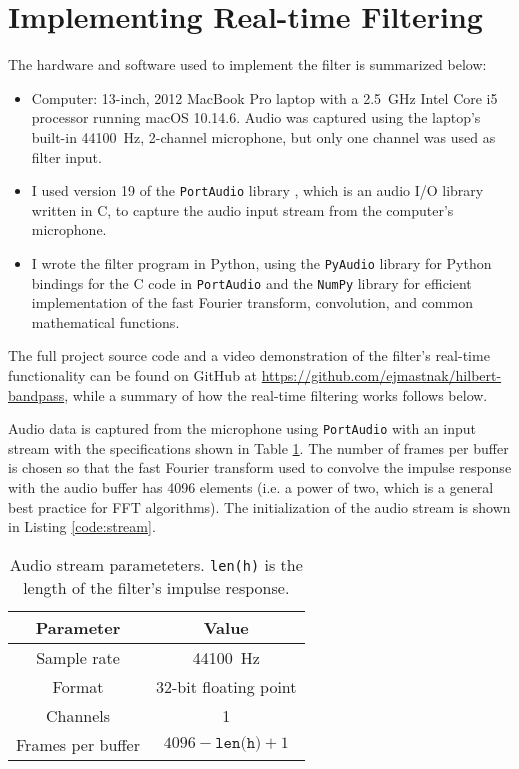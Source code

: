 \clearpage
\restoregeometry

\section{Implementing Real-time Filtering}
The hardware and software used to implement the filter is summarized below:
\begin{itemize}

    \item Computer: 13-inch, 2012 MacBook Pro laptop with a \SI{2.5}{\giga \hertz} Intel Core i5 processor running macOS 10.14.6.
    Audio was captured using the laptop's built-in \SI{44100}{\hertz}, 2-channel microphone, but only one channel was used as filter input.

    \item I used version 19 of the \texttt{PortAudio} library \cite{portaudio}, which is an audio I/O library written in C, to capture the audio input stream from the computer's microphone.

    \item I wrote the filter program in Python, using the \texttt{PyAudio} library \cite{pyaudio} for Python bindings for the C code in \texttt{PortAudio}
    and the \texttt{NumPy} library \cite{numpy} for efficient implementation of the fast Fourier transform, convolution, and common mathematical functions.

\end{itemize}
The full project source code and a video demonstration of the filter's real-time functionality can be found on GitHub at \url{https://github.com/ejmastnak/hilbert-bandpass},
while a summary of how the real-time filtering works follows below.

Audio data is captured from the microphone using \texttt{PortAudio} with an input stream with the specifications shown in Table \ref{tab:stream}.
The number of frames per buffer is chosen so that the fast Fourier transform used to convolve the impulse response with the audio buffer has 4096 elements (i.e. a power of two, which is a general best practice for FFT algorithms).
The initialization of the audio stream is shown in Listing \ref{code:stream}.

\begin{table}[htb!]
    \centering
    \begin{tabular}{|c|c|}
        \hline
        Parameter & Value\\
        \hline
        \hline
        Sample rate & \SI{44100}{\hertz}\\
        Format & 32-bit floating point\\
        Channels & 1\\
        Frames per buffer & $ 4096 - \texttt{len(h)} + 1 $\\
        \hline
    \end{tabular}
    \caption{Audio stream parameteters.
    \texttt{len(h)} is the length of the filter's impulse response.}
    \label{tab:stream}
\end{table}

